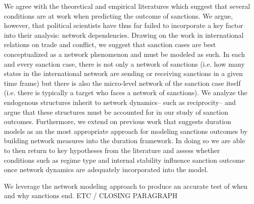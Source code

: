 We agree with the theoretical and empirical literatures which suggest that several conditions are at work when predicting the outcome of sanctions. We argue, however, that political scientists have thus far failed to incorporate a key factor into their analysis: network dependencies. Drawing on the work in international relations on trade and conflict, we suggest that sanction cases are best conceptualized as a network phenomenon and must be modeled as such. In each and every sanction case, there is not only a network of sanctions (i.e. how many states in the international network are sending or receiving sanctions in a given time frame) but there is also the micro-level network of the sanction case itself (i.e. there is typically a target who faces a network of sanctions). We analyze the endogenous structures inherit to network dynamics-- such as reciprocity-- and argue that these structures must be accounted for in our study of sanction outcomes. Furthermore, we extend on previous work that suggests duration models as an the most appropriate approach for modeling sanctions outcomes by building network measures into the duration framework. In doing so we are able to then return to key hypotheses from the literature and assess whether conditions such as regime type and internal stability influence sanction outcome once network dynamics are adequately incorporated into the model. 

We leverage the network modeling approach to produce an accurate test of when and why sanctions end. ETC / CLOSING PARAGRAPH
